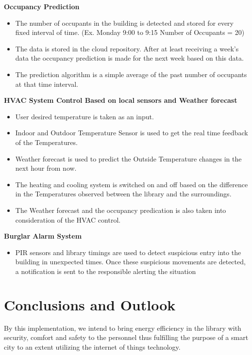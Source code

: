 \documentclass[runningheads]{llncs}
\begin{document}
\textbf{Occupancy Prediction}
\begin{itemize}
\item The number of occupants in the building is detected and stored for every fixed interval of time. (Ex. Monday 9:00 to 9:15 Number of Occupants = 20)
\item	The data is stored in the cloud repository. After at least receiving a week’s data the occupancy prediction is made for the next week based on this data.
\item The prediction algorithm is a simple average of the past number of occupants at that time interval. 
\end{itemize}

\textbf{HVAC System Control Based on local sensors and Weather forecast}
\begin{itemize}
\item User desired temperature is taken as an input.
\item Indoor and Outdoor Temperature Sensor is used to get the real time feedback of the Temperatures.
\item Weather forecast is used to predict the Outside Temperature changes in the next hour from now.
\item The heating and cooling system is switched on and off based on the difference in the Temperatures observed between the library and the surroundings.
\item The Weather forecast and the occupancy predication is also taken into consideration of the HVAC control.
\end{itemize}

\textbf{Burglar Alarm System}
\begin{itemize}
\item PIR sensors and library timings are used to detect suspicious entry into the building in unexpected times. Once these suspicious movements are detected, a notification is sent to the responsible alerting the situation
\end{itemize}
\section{Conclusions and Outlook}
By this implementation, we intend to bring energy efficiency in the library with security, comfort and safety to the personnel thus fulfilling the purpose of a smart city to an extent utilizing the internet of things technology.

%
%


\end{document}
